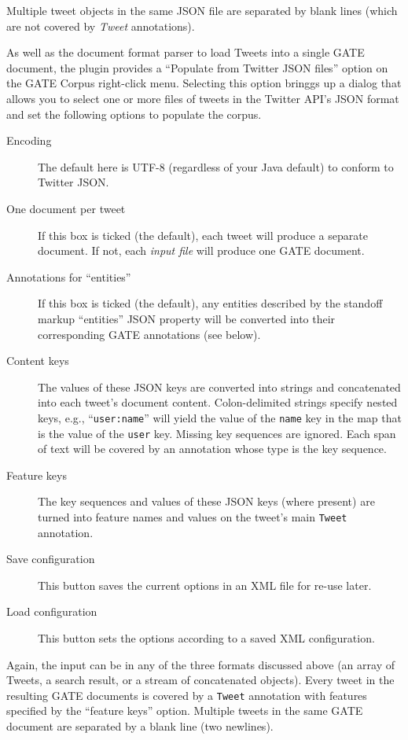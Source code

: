 Multiple tweet objects in the same JSON file are separated by blank lines (which
are not covered by \emph{Tweet} annotations).

As well as the document format parser to load Tweets into a single GATE
document, the plugin provides a ``Populate from Twitter JSON files'' option on
the GATE Corpus right-click menu.  Selecting this option bringgs up a dialog
that allows you to select one or more files of tweets in the Twitter API's JSON
format and set the following options to populate the corpus.
\begin{description}
\item[Encoding]  The default here is UTF-8 (regardless of your Java default) to
  conform to Twitter JSON.
\item[One document per tweet] If this box is ticked (the default), each tweet
  will produce a separate document.  If not, each {\em input file} will produce
  one GATE document.
\item[Annotations for ``entities''] If this box is ticked (the default), any
  entities described by the standoff markup ``entities'' JSON property will be
  converted into their corresponding GATE annotations (see below).
\item[Content keys] The values of these JSON keys are converted into strings and
  concatenated into each tweet's document content.  Colon-delimited strings
  specify nested keys, e.g., ``\texttt{user:name}'' will yield the value of the
  \texttt{name} key in the map that is the value of the \texttt{user} key.
  Missing key sequences are ignored.  Each span of text will be covered by an
  annotation whose type is the key sequence.
\item[Feature keys] The key sequences and values of these JSON keys (where
  present) are turned into feature names and values on the tweet's main
  \texttt{Tweet} annotation.
\item[Save configuration] This button saves the current options in an XML file
  for re-use later.
\item[Load configuration] This button sets the options according to a saved XML
  configuration.
\end{description}
Again, the input can be in any of the three formats discussed above (an array
of Tweets, a search result, or a stream of concatenated objects).
Every tweet in the resulting GATE documents is covered by a \texttt{Tweet}
annotation with features specified by the ``feature keys'' option.  Multiple
tweets in the same GATE document are separated by a blank line (two newlines).

